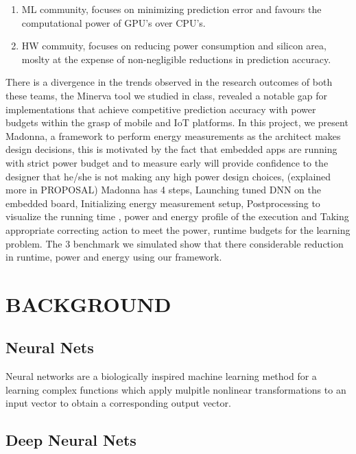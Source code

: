 \documentclass[letterpaper, 10 pt, conference]{ieeeconf}
\begin{document}
\begin{enumerate}
  \item ML community, focuses on minimizing prediction error and favours
        the computational power of GPU's over CPU's.
  \item HW commuity, focuses on reducing power consumption and silicon area, 
        moslty at the expense of non-negligible reductions in prediction accuracy.
\end{enumerate}

There is a divergence in the trends observed in the research outcomes of both
these teams, the Minerva tool we studied in class, revealed a notable gap
for implementations that achieve competitive prediction accuracy with power budgets 
within the grasp of mobile and IoT platforms.
In this project, we present Madonna, a framework to perform energy measurements
as the architect makes design decisions, this is motivated by the fact that 
embedded apps are running with strict power budget and to measure early will provide confidence to the designer that he/she is not making any high power design choices, (explained more in PROPOSAL)
Madonna has 4 steps, Launching tuned DNN on the embedded board, Initializing energy measurement setup, Postprocessing to visualize the running time , power and energy profile of the execution and Taking appropriate correcting action to meet the power, runtime budgets for the learning problem.
The 3 benchmark we simulated show that there considerable reduction in runtime, power and energy using our framework.


\section{BACKGROUND}

\subsection{Neural Nets}

Neural networks are a biologically inspired machine learning method
for a learning complex functions which apply mulpitle nonlinear
transformations to an input vector to obtain a corresponding output
vector.

\subsection{Deep Neural Nets}
\end{document}
